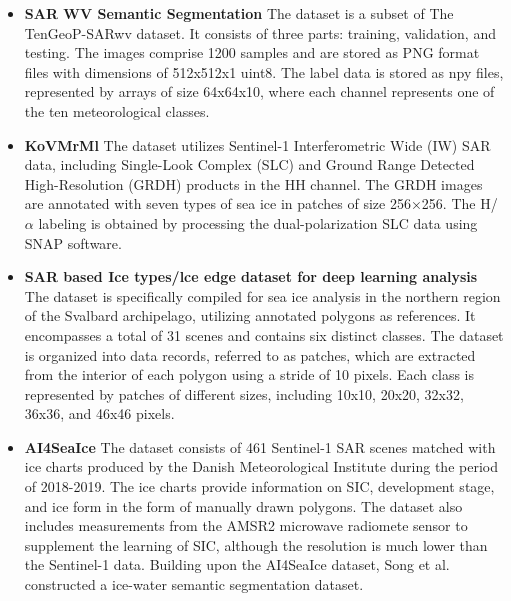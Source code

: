 \begin{itemize}
\item \textbf{SAR WV Semantic Segmentation} The dataset is a subset of The TenGeoP-SARwv dataset. It consists of three parts: training, validation, and testing. The images comprise 1200 samples and are stored as PNG format files with dimensions of 512x512x1 uint8. The label data is stored as npy files, represented by arrays of size 64x64x10, where each channel represents one of the ten meteorological classes.
\end{itemize}

\begin{itemize}
\item \textbf{KoVMrMl} The dataset utilizes Sentinel-1 Interferometric Wide (IW) SAR data, including Single-Look Complex (SLC) and Ground Range Detected High-Resolution (GRDH) products in the HH channel. The GRDH images are annotated with seven types of sea ice in patches of size 256×256. The H/$\alpha$ labeling is obtained by processing the dual-polarization SLC data using SNAP software.
\end{itemize}

\begin{itemize}
\item \textbf{SAR based Ice types/lce edge dataset for deep learning analysis} The dataset is specifically compiled for sea ice analysis in the northern region of the Svalbard archipelago, utilizing annotated polygons as references. It encompasses a total of 31 scenes and contains six distinct classes. The dataset is organized into data records, referred to as patches, which are extracted from the interior of each polygon using a stride of 10 pixels. Each class is represented by patches of different sizes, including 10x10, 20x20, 32x32, 36x36, and 46x46 pixels.
\end{itemize}

\begin{itemize}
\item \textbf{AI4SeaIce\cite{96stokholm2022ai4seaice}} The dataset consists of 461 Sentinel-1 SAR scenes matched with ice charts produced by the Danish Meteorological Institute during the period of 2018-2019. The ice charts provide information on SIC, development stage, and ice form in the form of manually drawn polygons. The dataset also includes measurements from the AMSR2 microwave radiomete sensor to supplement the learning of SIC, although the resolution is much lower than the Sentinel-1 data. Building upon the AI4SeaIce dataset, Song et al. \cite{117song2022mpspnet} constructed a ice-water semantic segmentation dataset.
\end{itemize}

